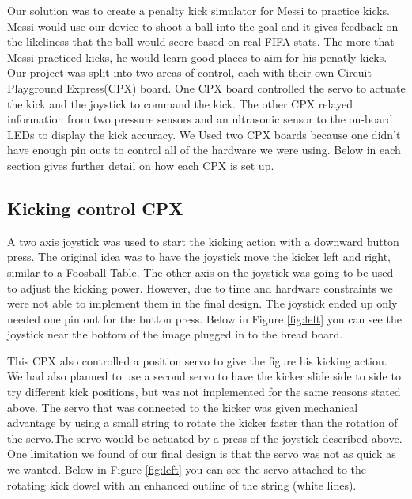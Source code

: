 \documentclass[12pt]{article}
\begin{document}
Our solution was to create a penalty kick simulator for Messi to practice kicks. Messi would use our device to shoot a ball into the goal and it gives feedback on the likeliness that the ball would score based on real FIFA stats. The more that Messi practiced kicks, he would learn good places to aim for his penatly kicks. Our project was split into two areas of control, each with their own Circuit Playground Express(CPX) board. One CPX board controlled the servo to actuate the kick and the joystick to command the kick. The other CPX relayed information from two pressure sensors and an ultrasonic sensor to the on-board LEDs to display the kick accuracy. We Used two CPX boards because one didn't have enough pin outs to control all of the hardware we were using. Below in each section gives further detail on how each CPX is set up. 

\subsection{Kicking control CPX}

A two axis joystick was used to start the kicking action with a downward button press. The original idea was to have the joystick move the kicker left and right, similar to a Foosball Table. The other axis on the joystick was going to be used to adjust the kicking power. However, due to time and hardware constraints we were not able to implement them in the final design. The joystick ended up only needed one pin out for the button press. Below in Figure \ref{fig:left} you can see the joystick near the bottom of the image plugged in to the bread board. 

This CPX also controlled a position servo to give the figure his kicking action. We had also planned to use a second servo to have the kicker slide side to side to try different kick positions, but was not implemented for the same reasons stated above. The servo that was connected to the kicker was given mechanical advantage by using a small string to rotate the kicker faster than the rotation of the servo.The servo would be actuated by a press of the joystick described above. One limitation we found of our final design is that the servo was not as quick as we wanted. Below in Figure \ref{fig:left} you can see the servo attached to the rotating kick dowel with an enhanced outline of the string (white lines).
\end{document}

